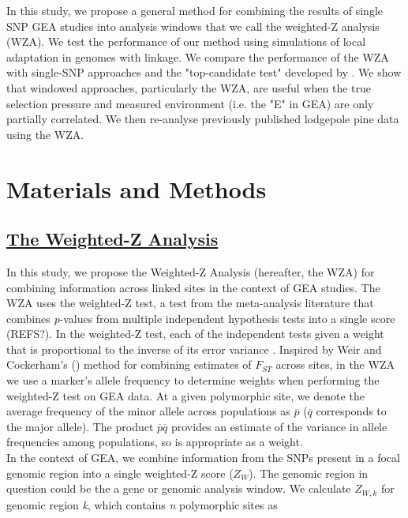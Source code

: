 \documentclass[10pt,twoside,lineno, twocolumn]{GSA_format}
\begin{document}
In this study, we propose a general method for combining the results of single SNP GEA studies into analysis windows that we call the weighted-Z analysis (WZA). We test the performance of our method using simulations of local adaptation in genomes with linkage. We compare the performance of the WZA with single-SNP approaches and the "top-candidate test" developed by \citep{Yeaman2016}. We show that windowed approaches, particularly the WZA, are useful when the true selection pressure and measured environment (i.e. the "E" in GEA) are only partially correlated. We then re-analyse previously published lodgepole pine data using the WZA. 

\section{Materials and Methods}
\label{sec:materials:methods}

\subsection{\underline{The Weighted-Z Analysis}} 

In this study, we propose the Weighted-Z Analysis (hereafter, the WZA) for combining information across linked sites in the context of GEA studies. The WZA uses the weighted-Z test, a test from the meta-analysis literature that combines \textit{p}-values from multiple independent hypothesis tests into a single score (REFS?). In the weighted-Z test, each of the independent tests given a weight that is proportional to the inverse of its error variance \citep{WHITLOCK2005}. Inspired by Weir and Cockerham's (\citeyear{Weir1984-tc}) method for combining estimates of $F_{ST}$ across sites, in the WZA we use a marker's allele frequency to determine weights when performing the weighted-Z test on GEA data. At a given polymorphic site, we denote the average frequency of the minor allele across populations as $\overline{p}$ ($\overline{q}$ corresponds to the major allele). The product $\overline{p}\overline{q}$ provides an estimate of the variance in allele frequencies among populations, so is appropriate as a weight. \\

In the context of GEA, we combine information from the SNPs present in a focal genomic region into a single weighted-Z score ($Z_W$). The genomic region in question could be the a gene or genomic analysis window. We calculate $Z_{W,k}$ for genomic region \textit{k}, which contains \textit{n} polymorphic sites as
\end{document}
